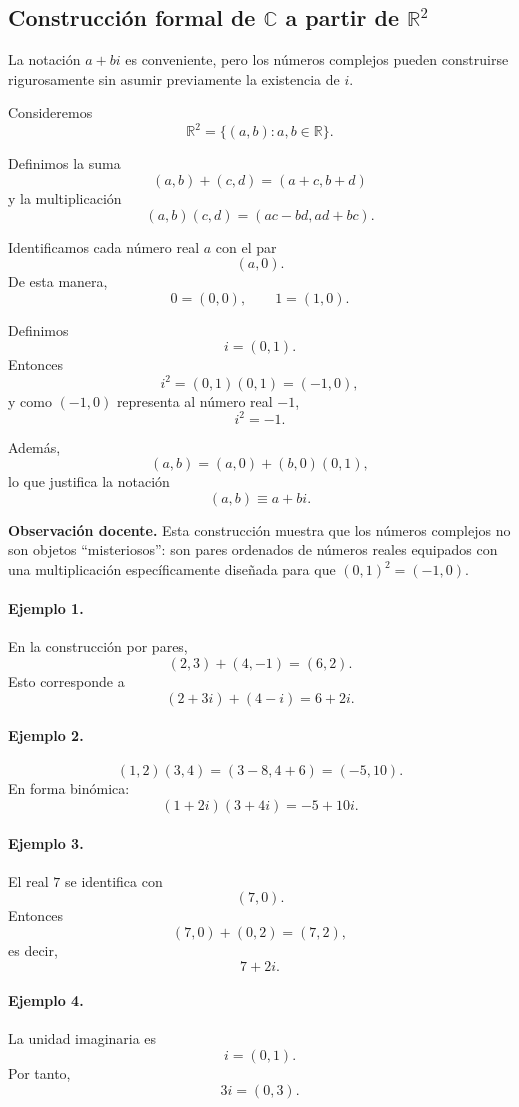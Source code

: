 \subsection{Construcción formal de $\mathbb{C}$ a partir de $\mathbb{R}^2$}

La notación $a+bi$ es conveniente, pero los números complejos pueden
construirse rigurosamente sin asumir previamente la existencia de $i$.

Consideremos
\[
\mathbb{R}^2
=
\{(a,b):a,b\in\mathbb{R}\}.
\]

Definimos la suma
\[
(a,b)+(c,d)
=
(a+c,b+d)
\]
y la multiplicación
\[
\boxed{
(a,b)(c,d)
=
(ac-bd,ad+bc).
}
\]

Identificamos cada número real $a$ con el par
\[
(a,0).
\]
De esta manera,
\[
0=(0,0),
\qquad
1=(1,0).
\]

Definimos
\[
i=(0,1).
\]
Entonces
\[
i^2
=
(0,1)(0,1)
=
(-1,0),
\]
y como $(-1,0)$ representa al número real $-1$,
\[
\boxed{i^2=-1.}
\]

Además,
\[
(a,b)
=
(a,0)+(b,0)(0,1),
\]
lo que justifica la notación
\[
(a,b)\equiv a+bi.
\]

\textbf{Observación docente.}
Esta construcción muestra que los números complejos no son objetos
``misteriosos'': son pares ordenados de números reales equipados con una
multiplicación específicamente diseñada para que $(0,1)^2=(-1,0)$.

\paragraph{Ejemplo 1.}
En la construcción por pares,
\[
(2,3)+(4,-1)
=
(6,2).
\]
Esto corresponde a
\[
(2+3i)+(4-i)=6+2i.
\]

\paragraph{Ejemplo 2.}
\[
(1,2)(3,4)
=
(3-8,4+6)
=
(-5,10).
\]
En forma binómica:
\[
(1+2i)(3+4i)=-5+10i.
\]

\paragraph{Ejemplo 3.}
El real $7$ se identifica con
\[
(7,0).
\]
Entonces
\[
(7,0)+(0,2)=(7,2),
\]
es decir,
\[
7+2i.
\]

\paragraph{Ejemplo 4.}
La unidad imaginaria es
\[
i=(0,1).
\]
Por tanto,
\[
3i=(0,3).
\]

